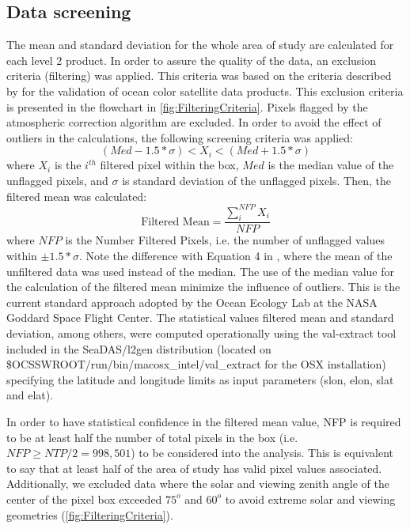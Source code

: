 \documentclass[onecolumn,3p,letterpaper,11pt]{elsarticle}
\begin{document}
\subsection{Data screening}
The mean and standard deviation for the whole area of study are calculated for each level 2 product. In order to assure the quality of the data, an exclusion criteria (filtering) was applied. This criteria was based on the criteria described by \citet{Bailey2006} for the validation of ocean color satellite data products. This exclusion criteria is presented in the flowchart in \autoref{fig:FilteringCriteria}. Pixels flagged by the atmospheric correction algorithm are excluded. In order to avoid the effect of outliers in the calculations, the following screening criteria was applied:
\begin{equation}\label{eq:filtered_value}
  (Med-1.5*\sigma) <  X_i < (Med+1.5*\sigma)
\end{equation}
where $X_i$ is the $i^{th}$ filtered pixel within the box, $Med$ is the median value of the unflagged pixels, and $\sigma$ is standard deviation of the unflagged pixels. Then, the filtered mean was calculated:
\begin{equation}\label{eq:filtered_mean}
  \text{Filtered Mean} =\frac{\displaystyle \sum_i^{NFP} X_i}{NFP}
\end{equation}
where $NFP$ is the Number Filtered Pixels, i.e. the number of unflagged values within $\pm 1.5*\sigma$. Note the difference with Equation 4 in \citet{Bailey2006}, where the mean of the unfiltered data was used instead of the median. The use of the median value for the calculation of the filtered mean minimize the influence of outliers. This is the current standard approach adopted by the Ocean Ecology Lab at the NASA Goddard Space Flight Center. The statistical values filtered mean and standard deviation, among others, were computed operationally using the val-extract tool included in the SeaDAS/l2gen distribution (located on {\ttfamily \$OCSSWROOT/run/bin/macosx\_intel/val\_extract}  for the OSX installation) specifying the latitude and longitude limits as input parameters (slon, elon, slat and elat).

In order to have statistical confidence in the filtered mean value, NFP is required to be at least half the number of total pixels in the box (i.e. $NFP\geq NTP/2 = 998,501$) to be considered into the analysis. This is equivalent to say that at least half of the area of study has valid pixel values associated. Additionally, we excluded data where the solar and viewing zenith angle of the center of the pixel box exceeded $75^o$ and $60^o$ to avoid extreme solar and  viewing geometries \citep{Bailey2006} (\autoref{fig:FilteringCriteria}). 
\end{document}

